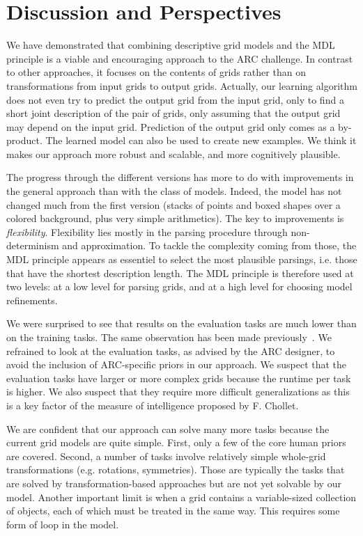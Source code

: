 \documentclass[a4paper]{llncs}
\begin{document}
\section{Discussion and Perspectives}
\label{conclu}


We have demonstrated that combining descriptive grid models and the
MDL principle is a viable and encouraging approach to the ARC
challenge. In contrast to other approaches, it focuses on the contents
of grids rather than on transformations from input grids to output
grids. Actually, our learning algorithm does not even try to predict
the output grid from the input grid, only to find a short joint
description of the pair of grids, only assuming that the output grid
may depend on the input grid. Prediction of the output grid only comes
as a by-product. The learned model can also be used to create new
examples. We think it makes our approach more robust and scalable, and
more cognitively plausible.

The progress through the different versions has more to do with
improvements in the general approach than with the class of
models. Indeed, the model has not changed much from the first version
(stacks of points and boxed shapes over a colored background, plus
very simple arithmetics). The key to improvements is {\em
  flexibility}. Flexibility lies mostly in the parsing procedure
through non-determinism and approximation. To tackle the complexity
coming from those, the MDL principle appears as essentiel to select
the most plausible parsings, i.e. those that have the shortest
description length. The MDL principle is therefore used at two levels:
at a low level for parsing grids, and at a high level for choosing
model refinements.

We were surprised to see that results on the evaluation tasks are much
lower than on the training tasks. The same observation has been made
previously~\cite{Fischer2020}. We refrained to look at the evaluation
tasks, as advised by the ARC designer, to avoid the inclusion of
ARC-specific priors in our approach. We suspect that the evaluation
tasks have larger or more complex grids because the runtime per task
is higher. We also suspect that they require more difficult
generalizations as this is a key factor of the measure of intelligence
proposed by F. Chollet.

We are confident that our approach can solve many more tasks because
the current grid models are quite simple. First, only a few of the
core human priors are covered. Second, a number of tasks involve
relatively simple whole-grid transformations (e.g. rotations,
symmetries). Those are typically the tasks that are solved by
transformation-based approaches but are not yet solvable by our
model. Another important limit is when a grid contains a
variable-sized collection of objects, each of which must be treated in
the same way. This requires some form of loop in the model.
\end{document}

